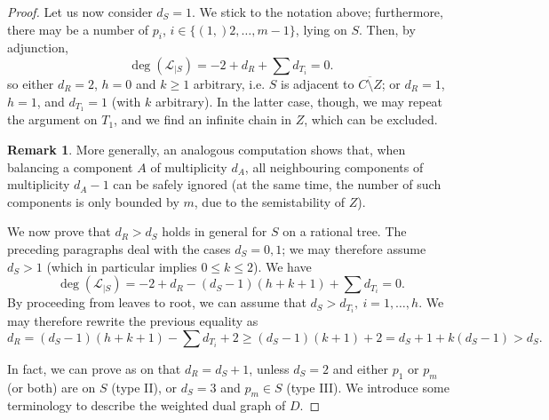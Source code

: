 \documentclass[11pt]{amsart}
\theoremstyle{plain}
\theoremstyle{definition}
\newtheorem{rem}[thm]{Remark}
\begin{document}
\begin{proof}
 Let us now consider $d_S=1$. We stick to the notation above; furthermore, there may be a number of $p_i$, $i\in\{(1,)2,\ldots,m-1\}$, lying on $S$. Then, by adjunction,
 \[\deg(\mathcal L_{|S})= -2+d_R+\sum d_{T_i}=0.\]
 so either $d_R=2$, $h=0$ and $k\geq 1$ arbitrary, i.e. $S$ is adjacent to $\overline{C\setminus Z}$; or $d_R=1$, $h=1$, and $d_{T_1}=1$ (with $k$ arbitrary). In the latter case, though, we may repeat the argument on $T_1$, and we find an infinite chain in $Z$, which can be excluded. 
 \begin{rem}\label{rmk:ignoring_1-trees}
  More generally, an analogous computation shows that, when balancing a component $A$ of multiplicity $d_A$, all neighbouring components of multiplicity $d_A-1$ can be safely ignored (at the same time, the number of such components is only bounded by $m$, due to the semistability of $Z$).%
 \end{rem}

 We now prove that $d_R>d_S$ holds in general for $S$ on a rational tree. The preceding paragraphs deal with the cases $d_S=0,1$; we may therefore assume $d_S>1$ (which in particular implies $0\leq k\leq 2$). We have
 \[\deg(\mathcal L_{|S})= -2+d_R-(d_S-1)(h+k+1)+\sum d_{T_i}=0.\]
 By proceeding from leaves to root, we can assume that $d_S>d_{T_i},\ i=1,\ldots,h$. We may therefore rewrite the previous equality as
 \[d_R=(d_S-1)(h+k+1)-\sum d_{T_i}+2\geq(d_S-1)(k+1)+2=d_S+1+k(d_S-1)>d_S.\]
 
In fact, we can prove as on \cite[p.893]{SMY1} that $d_R=d_S+1$, unless $d_S=2$ and either $p_1$ or $p_m$ (or both) are on $S$ (type II), or $d_S=3$ and $p_m\in S$ (type III). We introduce some terminology to describe the weighted dual graph of $D$.


\end{proof}
\end{document}
